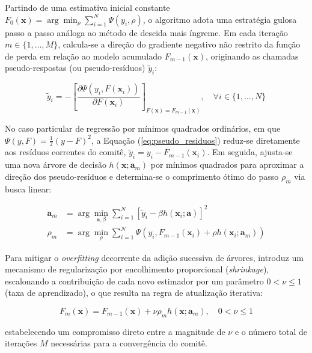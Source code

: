 Partindo de uma estimativa inicial constante $F_0(\mathbf{x}) = \arg\min_{\rho} \sum_{i=1}^{N} \Psi(y_i, \rho)$, o algoritmo adota uma estratégia gulosa passo a passo análoga ao método de descida mais íngreme. Em cada iteração $m \in \{1, \dots, M\}$, calcula-se a direção do gradiente negativo não restrito da função de perda em relação ao modelo acumulado $F_{m-1}(\mathbf{x})$, originando as chamadas pseudo-respostas (ou pseudo-resíduos) $\tilde{y}_i$:

\begin{equation}
    \tilde{y}_i = -\left[\frac{\partial \Psi(y_i, F(\mathbf{x}_i))}{\partial F(\mathbf{x}_i)}\right]_{F(\mathbf{x}) = F_{m-1}(\mathbf{x})}, \quad \forall i \in \{1, \dots, N\} \label{eq:pseudo_residuos}
\end{equation}

No caso particular de regressão por mínimos quadrados ordinários, em que $\Psi(y, F) = \frac{1}{2}(y - F)^2$, a Equação (\ref{eq:pseudo_residuos}) reduz-se diretamente aos resíduos correntes do comitê, $\tilde{y}_i = y_i - F_{m-1}(\mathbf{x}_i)$. Em seguida, ajusta-se uma nova árvore de decisão $h(\mathbf{x}; \mathbf{a}_m)$ por mínimos quadrados para aproximar a direção dos pseudo-resíduos e determina-se o comprimento ótimo do passo $\rho_m$ via busca linear:

\begin{align}
    \mathbf{a}_m &= \arg\min_{\mathbf{a}, \beta} \sum_{i=1}^{N} \left[\tilde{y}_i - \beta h(\mathbf{x}_i; \mathbf{a})\right]^2 \label{eq:ajuste_arvore_gb} \\
    \rho_m &= \arg\min_{\rho} \sum_{i=1}^{N} \Psi\left(y_i, F_{m-1}(\mathbf{x}_i) + \rho h(\mathbf{x}_i; \mathbf{a}_m)\right) \label{eq:line_search_gb}
\end{align}

Para mitigar o \textit{overfitting} decorrente da adição sucessiva de árvores,  introduz um mecanismo de regularização por encolhimento proporcional (\textit{shrinkage}), escalonando a contribuição de cada novo estimador por um parâmetro $0 < \nu \le 1$ (taxa de aprendizado), o que resulta na regra de atualização iterativa:

\begin{equation}
    F_m(\mathbf{x}) = F_{m-1}(\mathbf{x}) + \nu \rho_m h(\mathbf{x}; \mathbf{a}_m), \quad 0 < \nu \le 1 \label{eq:update_shrinkage_gb}
\end{equation}

\noindent estabelecendo um compromisso direto entre a magnitude de $\nu$ e o número total de iterações $M$ necessárias para a convergência do comitê.

